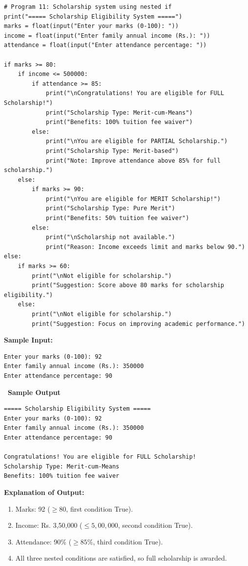 \documentclass[12pt,a4paper]{article}
\newcommand{\outhead}{\noindent\colorbox{cmrgreen!25}%
  {\textbf{\small\color{cmrdark}~Sample Output~}}\par\vspace{-1pt}}
\begin{document}
\begin{lstlisting}
# Program 11: Scholarship system using nested if
print("===== Scholarship Eligibility System =====")
marks = float(input("Enter your marks (0-100): "))
income = float(input("Enter family annual income (Rs.): "))
attendance = float(input("Enter attendance percentage: "))

if marks >= 80:
    if income <= 500000:
        if attendance >= 85:
            print("\nCongratulations! You are eligible for FULL Scholarship!")
            print("Scholarship Type: Merit-cum-Means")
            print("Benefits: 100% tuition fee waiver")
        else:
            print("\nYou are eligible for PARTIAL Scholarship.")
            print("Scholarship Type: Merit-based")
            print("Note: Improve attendance above 85% for full scholarship.")
    else:
        if marks >= 90:
            print("\nYou are eligible for MERIT Scholarship!")
            print("Scholarship Type: Pure Merit")
            print("Benefits: 50% tuition fee waiver")
        else:
            print("\nScholarship not available.")
            print("Reason: Income exceeds limit and marks below 90.")
else:
    if marks >= 60:
        print("\nNot eligible for scholarship.")
        print("Suggestion: Score above 80 marks for scholarship eligibility.")
    else:
        print("\nNot eligible for scholarship.")
        print("Suggestion: Focus on improving academic performance.")
\end{lstlisting}

\textbf{Sample Input:}
\begin{verbatim}
Enter your marks (0-100): 92
Enter family annual income (Rs.): 350000
Enter attendance percentage: 90
\end{verbatim}

\outhead
\begin{lstlisting}[style=outputstyle]
===== Scholarship Eligibility System =====
Enter your marks (0-100): 92
Enter family annual income (Rs.): 350000
Enter attendance percentage: 90

Congratulations! You are eligible for FULL Scholarship!
Scholarship Type: Merit-cum-Means
Benefits: 100% tuition fee waiver
\end{lstlisting}

\textbf{Explanation of Output:}
\begin{enumerate}
  \item Marks: 92 ($\geq 80$, first condition True).
  \item Income: Rs. 3,50,000 ($\leq 5,00,000$, second condition True).
  \item Attendance: 90\% ($\geq 85\%$, third condition True).
  \item All three nested conditions are satisfied, so full scholarship is awarded.
\end{enumerate}
\end{document}
